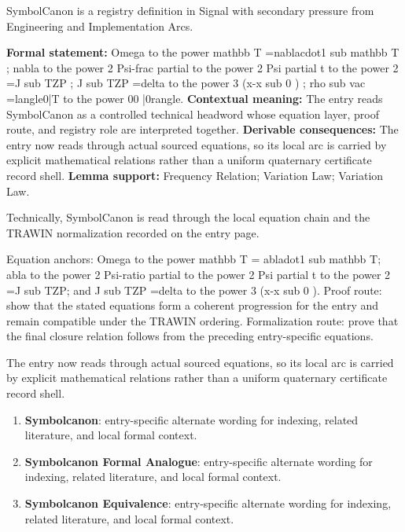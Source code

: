 
\begingroup\small
{}
SymbolCanon is a registry definition in Signal with secondary pressure from Engineering and Implementation Arcs.

\begingroup\footnotesize\setlength{\emergencystretch}{3em}\sloppy
\textbf{Formal statement:} Omega to the power mathbb T =nablacdot1 sub mathbb T ; nabla to the power 2 Psi-frac partial to the power 2 Psi partial t to the power 2 =J sub TZP ; J sub TZP =delta to the power 3 (x-x sub 0 ) ; rho sub vac =langle0|T to the power 00 |0rangle. \textbf{Contextual meaning:} The entry reads SymbolCanon as a controlled technical headword whose equation layer, proof route, and registry role are interpreted together. \textbf{Derivable consequences:} The entry now reads through actual sourced equations, so its local arc is carried by explicit mathematical relations rather than a uniform quaternary certificate record shell. \textbf{Lemma support:} Frequency Relation; Variation Law; Variation Law.\par
\endgroup

Technically, SymbolCanon is read through the local equation chain and the TRAWIN normalization recorded on the entry page.

Equation anchors: Omega to the power mathbb T = abladot1 sub mathbb T; abla to the power 2 Psi-ratio partial to the power 2 Psi partial t to the power 2 =J sub TZP; and J sub TZP =delta to the power 3 (x-x sub 0 ). Proof route: show that the stated equations form a coherent progression for the entry and remain compatible under the TRAWIN ordering. Formalization route: prove that the final closure relation follows from the preceding entry-specific equations.

The entry now reads through actual sourced equations, so its local arc is carried by explicit mathematical relations rather than a uniform quaternary certificate record shell.
\endgroup

\begin{enumerate}[leftmargin=1.6em,itemsep=6pt,topsep=4pt]
\item \textbf{Symbolcanon}: entry-specific alternate wording for indexing, related literature, and local formal context.
\item \textbf{Symbolcanon Formal Analogue}: entry-specific alternate wording for indexing, related literature, and local formal context.
\item \textbf{Symbolcanon Equivalence}: entry-specific alternate wording for indexing, related literature, and local formal context.
\end{enumerate}

